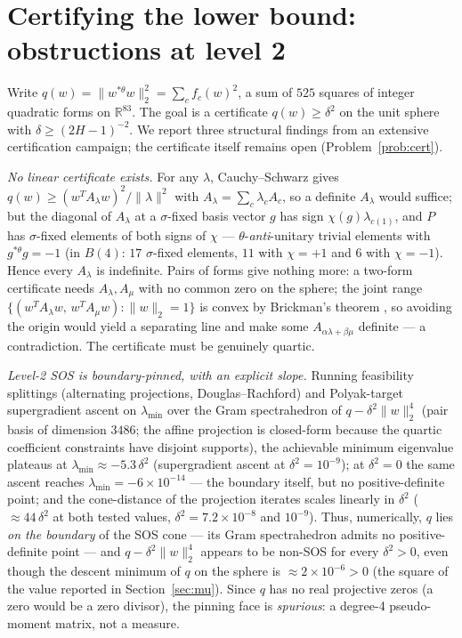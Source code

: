 \documentclass[10pt,a4paper]{amsart}
\newcommand{\RR}{\mathbb{R}}
\newcommand{\thst}{{*\theta}}
\begin{document}
\section{Certifying the lower bound: obstructions at level 2}
\label{sec:sos}

Write $q(w)=\|w^{\thst}w\|_2^2=\sum_c f_c(w)^2$, a sum of $525$
squares of integer quadratic forms on $\RR^{83}$.  The goal is a
certificate $q(w)\ge\delta^2$ on the unit sphere with
$\delta\ge(2H-1)^{-2}$.  We report three structural findings from an
extensive certification campaign; the certificate itself remains open
(Problem~\ref{prob:cert}).

\emph{No linear certificate exists.}  For any $\lambda$,
Cauchy--Schwarz gives $q(w)\ge (w^TA_\lambda w)^2/\|\lambda\|^2$ with
$A_\lambda=\sum_c\lambda_cA_c$, so a definite $A_\lambda$ would
suffice; but the diagonal of $A_\lambda$ at a $\sigma$-fixed basis
vector $g$ has sign $\chi(g)\lambda_{c(1)}$, and $P$ has
$\sigma$-fixed elements of both signs of $\chi$ ---
$\theta$-\emph{anti}-unitary trivial elements with $g^{\thst}g=-1$
(in $B(4)$: $17$ $\sigma$-fixed elements, $11$ with $\chi=+1$ and $6$
with $\chi=-1$).  Hence every $A_\lambda$ is indefinite.  Pairs of
forms give nothing more: a two-form certificate needs
$A_\lambda,A_\mu$ with no common zero on the sphere; the joint range
$\{(w^TA_\lambda w,\,w^TA_\mu w):\|w\|_2=1\}$ is convex by Brickman's
theorem \cite{Brickman1961}, so avoiding the origin would yield a
separating line and make some $A_{\alpha\lambda+\beta\mu}$ definite
--- a contradiction.  The certificate must be genuinely quartic.

\emph{Level-2 SOS is boundary-pinned, with an explicit slope.}
Running feasibility splittings (alternating projections,
Douglas--Rachford) and Polyak-target supergradient ascent on
$\lambda_{\min}$ over the Gram spectrahedron of
$q-\delta^2\|w\|_2^4$ (pair basis of dimension $3486$; the affine
projection is closed-form because the quartic coefficient constraints
have disjoint supports), the achievable minimum eigenvalue plateaus at
$\lambda_{\min}\approx -5.3\,\delta^2$ (supergradient ascent at
$\delta^2=10^{-9}$); at $\delta^2=0$ the same ascent reaches
$\lambda_{\min}=-6\times10^{-14}$ --- the boundary itself, but no
positive-definite point; and the cone-distance of the projection
iterates scales linearly in $\delta^2$ ($\approx 44\,\delta^2$ at both
tested values, $\delta^2=7.2\times10^{-8}$ and $10^{-9}$).  Thus,
numerically, $q$ lies \emph{on the boundary} of the SOS cone --- its
Gram spectrahedron admits no positive-definite point --- and
$q-\delta^2\|w\|_2^4$ appears to be non-SOS for every $\delta^2>0$,
even though the descent minimum of $q$ on the sphere is
$\approx2\times10^{-6}>0$ (the square of the value reported in
Section~\ref{sec:mu}).  Since $q$ has no real projective zeros (a zero
would be a zero divisor), the pinning face is \emph{spurious}: a
degree-4 pseudo-moment matrix, not a measure.
\end{document}
